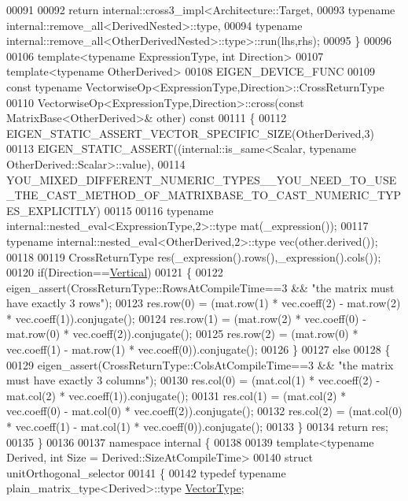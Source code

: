 \begin{DoxyCode}
00091 
00092   return internal::cross3\_impl<Architecture::Target,
00093                         typename internal::remove\_all<DerivedNested>::type,
00094                         typename internal::remove\_all<OtherDerivedNested>::type>::run(lhs,rhs);
00095 \}
00096 
00106 template<typename ExpressionType, \textcolor{keywordtype}{int} Direction>
00107 template<typename OtherDerived>
00108 EIGEN\_DEVICE\_FUNC 
00109 const typename VectorwiseOp<ExpressionType,Direction>::CrossReturnType
00110 VectorwiseOp<ExpressionType,Direction>::cross(const MatrixBase<OtherDerived>& other)\textcolor{keyword}{ const}
00111 \textcolor{keyword}{}\{
00112   EIGEN\_STATIC\_ASSERT\_VECTOR\_SPECIFIC\_SIZE(OtherDerived,3)
00113   EIGEN\_STATIC\_ASSERT((internal::is\_same<Scalar, typename OtherDerived::Scalar>::value),
00114     
      YOU\_MIXED\_DIFFERENT\_NUMERIC\_TYPES\_\_YOU\_NEED\_TO\_USE\_THE\_CAST\_METHOD\_OF\_MATRIXBASE\_TO\_CAST\_NUMERIC\_TYPES\_EXPLICITLY)
00115   
00116   typename internal::nested\_eval<ExpressionType,2>::type mat(\_expression());
00117   typename internal::nested\_eval<OtherDerived,2>::type vec(other.derived());
00118 
00119   CrossReturnType res(\_expression().rows(),\_expression().cols());
00120   if(Direction==\hyperlink{group__enums_ggad49a7b3738e273eb00932271b36127f7addca718e0564723df21d61b94b1198be}{Vertical})
00121   \{
00122     eigen\_assert(CrossReturnType::RowsAtCompileTime==3 && \textcolor{stringliteral}{"the matrix must have exactly 3 rows"});
00123     res.row(0) = (mat.row(1) * vec.coeff(2) - mat.row(2) * vec.coeff(1)).conjugate();
00124     res.row(1) = (mat.row(2) * vec.coeff(0) - mat.row(0) * vec.coeff(2)).conjugate();
00125     res.row(2) = (mat.row(0) * vec.coeff(1) - mat.row(1) * vec.coeff(0)).conjugate();
00126   \}
00127   \textcolor{keywordflow}{else}
00128   \{
00129     eigen\_assert(CrossReturnType::ColsAtCompileTime==3 && \textcolor{stringliteral}{"the matrix must have exactly 3 columns"});
00130     res.col(0) = (mat.col(1) * vec.coeff(2) - mat.col(2) * vec.coeff(1)).conjugate();
00131     res.col(1) = (mat.col(2) * vec.coeff(0) - mat.col(0) * vec.coeff(2)).conjugate();
00132     res.col(2) = (mat.col(0) * vec.coeff(1) - mat.col(1) * vec.coeff(0)).conjugate();
00133   \}
00134   \textcolor{keywordflow}{return} res;
00135 \}
00136 
00137 \textcolor{keyword}{namespace }internal \{
00138 
00139 \textcolor{keyword}{template}<\textcolor{keyword}{typename} Derived, \textcolor{keywordtype}{int} Size = Derived::SizeAtCompileTime>
00140 \textcolor{keyword}{struct }unitOrthogonal\_selector
00141 \{
00142   \textcolor{keyword}{typedef} \textcolor{keyword}{typename} plain\_matrix\_type<Derived>::type \hyperlink{struct_vector_type}{VectorType};

\end{DoxyCode}
